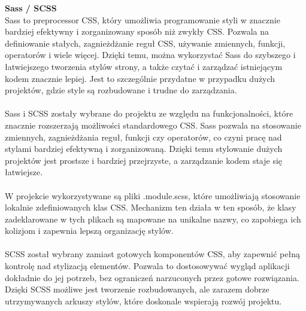 \documentclass[12pt,a4paper]{article}
\begin{document}
\noindent \textbf{Sass / SCSS}\\
Sass to preprocessor CSS, który umożliwia programowanie styli w znacznie bardziej efektywny i zorganizowany sposób niż zwykły CSS. Pozwala na definiowanie stałych, zagnieżdżanie reguł CSS, używanie zmiennych, funkcji, operatorów i wiele więcej. Dzięki temu, można wykorzystać Sass do szybszego i łatwiejszego tworzenia stylów strony, a także czytać i zarządzać istniejącym kodem znacznie lepiej. Jest to szczególnie przydatne w przypadku dużych projektów, gdzie style są rozbudowane i trudne do zarządzania.
\\\\
Sass i SCSS zostały wybrane do projektu ze względu na funkcjonalności, które znacznie rozszerzają możliwości standardowego CSS. Sass pozwala na stosowanie zmiennych, zagnieżdżania reguł, funkcji czy operatorów, co czyni pracę nad stylami bardziej efektywną i zorganizowaną. Dzięki temu stylowanie dużych projektów jest prostsze i bardziej przejrzyste, a zarządzanie kodem staje się łatwiejsze.
\\\\
W projekcie wykorzystywane są pliki .module.scss, które umożliwiają stosowanie lokalnie zdefiniowanych klas CSS. Mechanizm ten działa w ten sposób, że klasy zadeklarowane w tych plikach są mapowane na unikalne nazwy, co zapobiega ich kolizjom i zapewnia lepszą organizację stylów.
\\\\
SCSS został wybrany zamiast gotowych komponentów CSS, aby zapewnić pełną kontrolę nad stylizacją elementów. Pozwala to dostosowywać wygląd aplikacji dokładnie do jej potrzeb, bez ograniczeń narzuconych przez gotowe rozwiązania. Dzięki SCSS możliwe jest tworzenie rozbudowanych, ale zarazem dobrze utrzymywanych arkuszy stylów, które doskonale wspierają rozwój projektu.

\newpage
\end{document}
